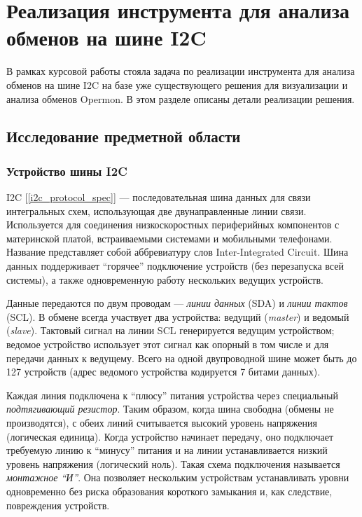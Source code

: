 \section{Реализация инструмента для анализа обменов на шине I2C}

В рамках курсовой работы стояла задача по реализации инструмента для анализа обменов на шине I2C на базе уже существующего решения для визуализации и анализа обменов Opermon. В этом разделе описаны детали реализации решения.

\subsection{Исследование предметной области}

\subsubsection{Устройство шины I2C}

I2C [\ref{i2c_protocol_spec}] — последовательная шина данных для связи интегральных схем, использующая две двунаправленные линии связи. Используется для соединения низкоскоростных периферийных компонентов с материнской платой, встраиваемыми системами и мобильными телефонами. Название представляет собой аббревиатуру слов Inter-Integrated Circuit. Шина данных поддерживает ``горячее'' подключение устройств (без перезапуска всей системы), а также одновременную работу нескольких ведущих устройств.

Данные передаются по двум проводам — \textit{линии данных} (SDA) и \textit{линии тактов} (SCL). В обмене всегда участвует два устройства: ведущий (\textit{master}) и ведомый (\textit{slave}). Тактовый сигнал на линии SCL генерируется ведущим устройством; ведомое устройство использует этот сигнал как опорный в том числе и для передачи данных к ведущему. Всего на одной двупроводной шине может быть до 127 устройств (адрес ведомого устройства кодируется 7 битами данных).

Каждая линия подключена к ``плюсу'' питания устройства через специальный \textit{подтягивающий резистор}. Таким образом, когда шина свободна  (обмены не производятся), с обеих линий считывается высокий уровень напряжения (логическая единица). Когда устройство начинает передачу, оно подключает требуемую линию к ``минусу'' питания и на линии устанавливается низкий уровень напряжения (логический ноль). Такая схема подключения называется \textit{монтажное ``И''}. Она позволяет нескольким устройствам устанавливать уровни одновременно без риска образования короткого замыкания и, как следствие, повреждения устройств.

